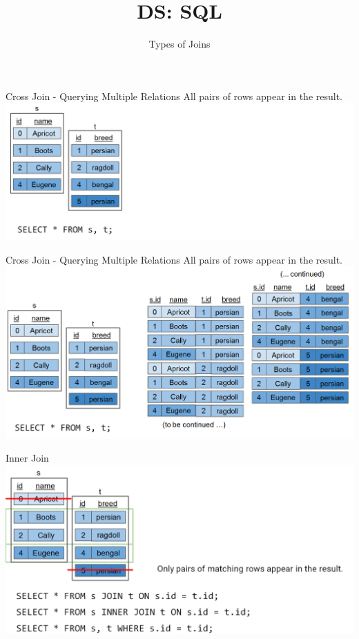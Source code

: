 \documentclass[aspectratio=169]{../latex_main/tntbeamer}  %
\title[Introduction]{DS: SQL}
\subtitle{Types of Joins}
\begin{document}
	
	\maketitle
	\begin{frame}{Cross Join - Querying Multiple Relations}
	    All pairs of rows appear in the result.\\
	    \includegraphics[scale=.4]{Bild9}
	\end{frame}
	
	
	\begin{frame}{Cross Join - Querying Multiple Relations}
	    All pairs of rows appear in the result.\\
	    \includegraphics[scale=.35]{Bild10}
	\end{frame}
	
	
	\begin{frame}{Inner Join}
	    \includegraphics[scale=.4]{Bild11}
	\end{frame}
	
\end{document}
